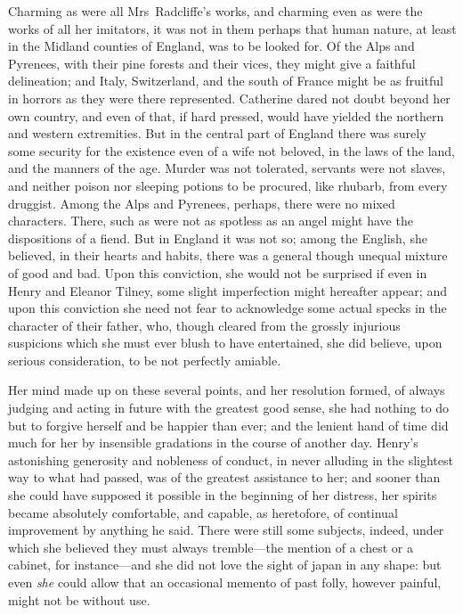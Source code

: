  Charming as were all Mrs~Radcliffe's works, and charming even as were the works of all her imitators, it was not in them perhaps that human nature, at least in the Midland counties of England, was to be looked for. Of the Alps and Pyrenees, with their pine forests and their vices, they might give a faithful delineation; and Italy, Switzerland, and the south of France might be as fruitful in horrors as they were there represented. Catherine dared not doubt beyond her own country, and even of that, if hard pressed, would have yielded the northern and western extremities. But in the central part of England there was surely some security for the existence even of a wife not beloved, in the laws of the land, and the manners of the age. Murder was not tolerated, servants were not slaves, and neither poison nor sleeping potions to be procured, like rhubarb, from every druggist. Among the Alps and Pyrenees, perhaps, there were no mixed characters. There, such as were not as spotless as an angel might have the dispositions of a fiend. But in England it was not so; among the English, she believed, in their hearts and habits, there was a general though unequal mixture of good and bad. Upon this conviction, she would not be surprised if even in Henry and Eleanor Tilney, some slight imperfection might hereafter appear; and upon this conviction she need not fear to acknowledge some actual specks in the character of their father, who, though cleared from the grossly injurious suspicions which she must ever blush to have entertained, she did believe, upon serious consideration, to be not perfectly amiable. 

 Her mind made up on these several points, and her resolution formed, of always judging and acting in future with the greatest good sense, she had nothing to do but to forgive herself and be happier than ever; and the lenient hand of time did much for her by insensible gradations in the course of another day. Henry's astonishing generosity and nobleness of conduct, in never alluding in the slightest way to what had passed, was of the greatest assistance to her; and sooner than she could have supposed it possible in the beginning of her distress, her spirits became absolutely comfortable, and capable, as heretofore, of continual improvement by anything he said. There were still some subjects, indeed, under which she believed they must always tremble—the mention of a chest or a cabinet, for instance—and she did not love the sight of japan in any shape: but even \textit{she} could allow that an occasional memento of past folly, however painful, might not be without use. 

